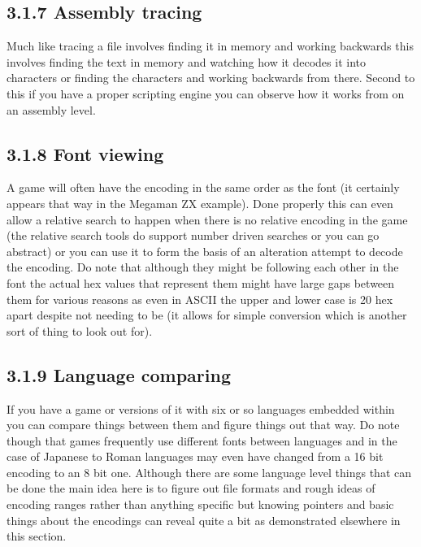 \documentclass[
]{book}
\begin{document}
\hypertarget{assembly-tracing}{%
\subsection{3.1.7 Assembly tracing}\label{assembly-tracing}}

Much like tracing a file involves finding it in memory and working backwards this involves finding the text in memory and watching how it decodes it into characters or finding the characters and working backwards from there. Second to this if you have a proper scripting engine you can observe how it works from on an assembly level.

\hypertarget{font-viewing}{%
\subsection{3.1.8 Font viewing}\label{font-viewing}}

A game will often have the encoding in the same order as the font (it certainly appears that way in the Megaman ZX example). Done properly this can even allow a relative search to happen when there is no relative encoding in the game (the relative search tools do support number driven searches or you can go abstract) or you can use it to form the basis of an alteration attempt to decode the encoding. Do note that although they might be following each other in the font the actual hex values that represent them might have large gaps between them for various reasons as even in ASCII the upper and lower case is 20 hex apart despite not needing to be (it allows for simple conversion which is another sort of thing to look out for).

\hypertarget{language-comparing}{%
\subsection{3.1.9 Language comparing}\label{language-comparing}}

If you have a game or versions of it with six or so languages embedded within you can compare things between them and figure things out that way. Do note though that games frequently use different fonts between languages and in the case of Japanese to Roman languages may even have changed from a 16 bit encoding to an 8 bit one. Although there are some language level things that can be done the main idea here is to figure out file formats and rough ideas of encoding ranges rather than anything specific but knowing pointers and basic things about the encodings can reveal quite a bit as demonstrated elsewhere in this section.
\end{document}

